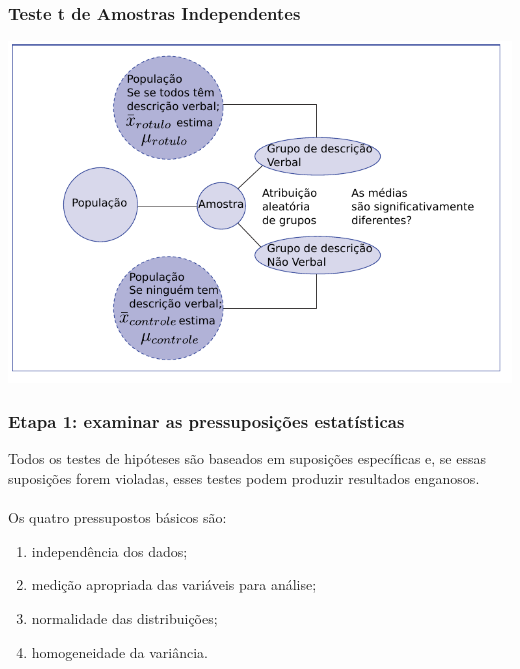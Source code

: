 \documentclass[11pt]{beamer}
\begin{document}
\begin{frame}
\frametitle{Teste t de Amostras Independentes}

\begin{center}\includegraphics[width=0.9\linewidth]{figs/fig10.2} \end{center}

\end{frame}


\begin{frame}
\frametitle{Etapa 1: examinar as pressuposições estatísticas}

Todos os testes de hipóteses são baseados em suposições específicas e, se essas suposições forem violadas, esses testes podem produzir resultados enganosos.\\~\\
Os quatro pressupostos básicos são:

\begin{enumerate}
\item independência dos dados;
\item medição apropriada das variáveis para análise;
\item normalidade das distribuições;
\item homogeneidade da variância.
\end{enumerate}

\end{frame}
\end{document}
